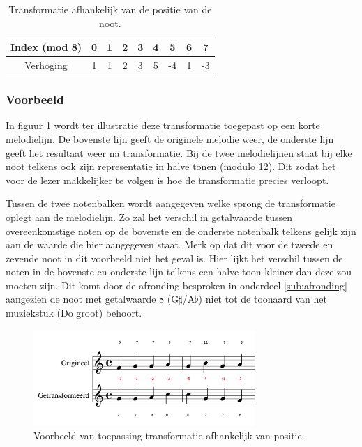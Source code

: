 \begin{table}
  \centering
  \begin{tabular}{c | c c c c c c c c }
    Index (mod 8) & 0 & 1 & 2 & 3 & 4 & 5 & 6 & 7 \\
    \hline
    \hline
    Verhoging & 1 & 1 & 2 & 3 & 5 & -4 & 1 & -3 \\
  \end{tabular}
  \caption{Transformatie afhankelijk van de positie van de noot.}
  \label{tabel:transformatie1}
\end{table}

\subsubsection{Voorbeeld}
In figuur \ref{figuur:voorbeeld_transformatie_1} wordt ter illustratie deze transformatie toegepast op een korte melodielijn. De bovenste lijn geeft de originele melodie weer, de onderste lijn geeft het resultaat weer na transformatie. Bij de twee melodielijnen staat bij elke noot telkens ook zijn representatie in halve tonen (modulo 12). Dit zodat het voor de lezer makkelijker te volgen is hoe de transformatie precies verloopt. 

Tussen de twee notenbalken wordt aangegeven welke sprong de transformatie oplegt aan de melodielijn. Zo zal het verschil in getalwaarde tussen overeenkomstige noten op de bovenste en de onderste notenbalk telkens gelijk zijn aan de waarde die hier aangegeven staat. Merk op dat dit voor de tweede en zevende noot in dit voorbeeld niet het geval is. Hier lijkt het verschil tussen de noten in de bovenste en onderste lijn telkens een halve toon kleiner dan deze zou moeten zijn. Dit komt door de afronding besproken in onderdeel \ref{sub:afronding} aangezien de noot met getalwaarde 8 (G$\sharp$/A$\flat$) niet tot de toonaard van het muziekstuk (Do groot) behoort.

\begin{figure}[!ht]
  \centering
  \includegraphics[width=0.75\textwidth]{3_Melodische_Transformatie/transfo1}
  \caption{Voorbeeld van toepassing transformatie afhankelijk van positie.}
  \label{figuur:voorbeeld_transformatie_1}
\end{figure}

